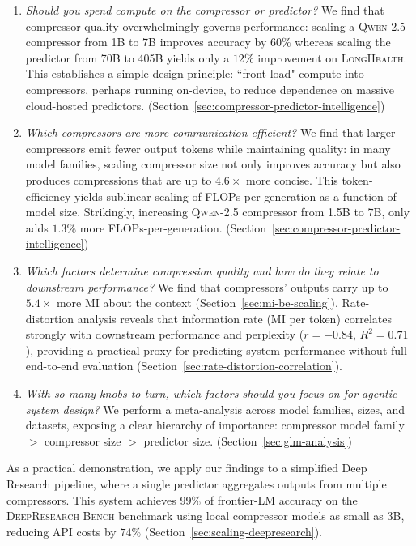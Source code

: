 \documentclass{article} %
\begin{document}
\begin{enumerate}[leftmargin=20pt]
    \item \emph{Should you spend compute on the compressor or predictor?} We find that compressor quality overwhelmingly governs performance: scaling a \textsc{Qwen-2.5} compressor from 1B to 7B improves accuracy by $60\%$ whereas scaling the predictor from 70B to 405B yields only a $12\%$ improvement on \textsc{LongHealth}. This establishes a simple design principle: ``front-load" compute into compressors, perhaps running on-device, to reduce dependence on massive cloud-hosted predictors. (Section~\ref{sec:compressor-predictor-intelligence})
    \item \emph{Which compressors are more communication-efficient?} We find that larger compressors emit fewer output tokens while maintaining quality: in many model families, scaling compressor size not only improves accuracy but also produces compressions that are up to $4.6\times$ more concise. This token-efficiency yields sublinear scaling of FLOPs-per-generation as a function of model size.
    Strikingly, increasing \textsc{Qwen-2.5} compressor from 1.5B to 7B, only adds $1.3\%$ more FLOPs-per-generation. (Section~\ref{sec:compressor-predictor-intelligence})
    \item \emph{Which factors determine compression quality and how do they relate to downstream performance?} We find that compressors' outputs carry up to $5.4\times$ more MI about the context (Section~\ref{sec:mi-be-scaling}). Rate-distortion analysis reveals that information rate (MI per token) correlates strongly with downstream performance and perplexity ($r=-0.84$, $R^2 = 0.71$), providing a practical proxy for predicting system performance without full end-to-end evaluation (Section~\ref{sec:rate-distortion-correlation}). 
    \item \emph{With so many knobs to turn, which factors should you focus on for agentic system design?} We perform a meta-analysis across model families, sizes, and datasets, exposing a clear hierarchy of importance: compressor model family $>$ compressor size $>$ predictor size. (Section~\ref{sec:glm-analysis})
\end{enumerate}

As a practical demonstration, we apply our findings to a simplified Deep Research pipeline, where a single predictor aggregates outputs from multiple compressors. This system achieves $99\%$ of frontier-LM accuracy on the \textsc{DeepResearch Bench} benchmark \citep{du2025deepresearch} using local compressor models as small as 3B, reducing API costs by $74\%$ (Section~\ref{sec:scaling-deepresearch}).
\end{document}
